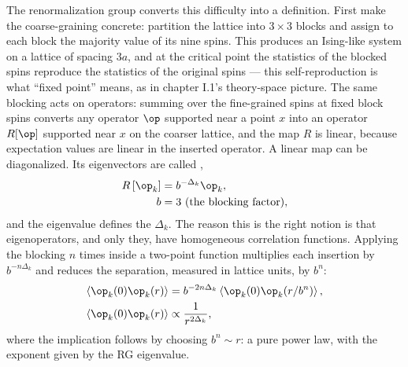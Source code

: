 The renormalization group converts this difficulty into a definition. First
make the coarse-graining concrete: partition the lattice into $3\times3$
blocks and assign to each block the majority value of its nine spins. This
produces an Ising-like system on a lattice of spacing $3a$, and at the
critical point the statistics of the blocked spins reproduce the statistics
of the original spins --- this self-reproduction is what ``fixed point''
means, as in chapter I.1's theory-space picture. The same blocking acts on
operators: summing over the fine-grained spins at fixed block spins converts
any operator $\op$ supported near a point $x$ into an operator $R[\op]$
supported near $x$ on the coarser lattice, and the map $R$ is linear, because
expectation values are linear in the inserted operator. A linear map can be
diagonalized. Its eigenvectors are called ,
\begin{equation}
\begin{aligned}
R\left[\op_k\right] &= b^{-\Delta_k} \op_k,\\
b &= 3 \text{ (the blocking factor)} ,
\end{aligned}
\label{eq:rg-eigenvector}
\end{equation}
and the eigenvalue defines the  $\Delta_k$. The
reason this is the right notion is that eigenoperators, and only they, have
homogeneous correlation functions. Applying the blocking $n$ times inside a
two-point function multiplies each insertion by $b^{-n\Delta_k}$ and reduces
the separation, measured in lattice units, by $b^n$:
\begin{equation}
\begin{aligned}
\left\langle \op_k(0)\op_k(r) \right\rangle
&= b^{-2n\Delta_k}\left\langle \op_k(0)\op_k(r/b^n) \right\rangle,\\
\left\langle \op_k(0)\op_k(r) \right\rangle
&\propto \frac{1}{r^{2\Delta_k}},
\end{aligned}
\label{eq:rg-power-law}
\end{equation}
where the implication follows by choosing $b^n \sim r$: a pure power law,
with the exponent given by the RG eigenvalue.


